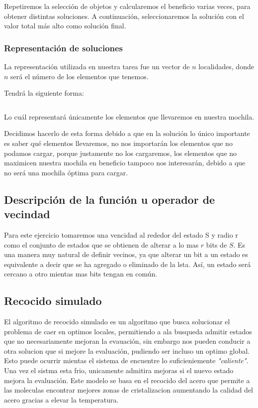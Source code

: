 \documentclass{article}
\begin{document}
Repetiremos la selección de objetos y calcularemos el beneficio varias veces, para obtener distintas soluciones. A continuación, seleccionaremos  la solución con el valor total más alto como solución final.

\subsubsection*{Representación de soluciones}
La representación utilizada en nuestra tarea fue un vector de $n$ localidades, donde $n$ será el número de los elementos que tenemos.

Tendrá la siguiente forma:

\begin{equation*}
[x_1, x_2, x_3, \dots x_n]
\end{equation*}

Lo cuál representará únicamente los elementos que llevaremos en nuestra mochila.

Decidimos hacerlo de esta forma debido a que en la solución lo único importante es saber qué elementos llevaremos, no nos importarán los elementos que no podamos cargar, porque justamente no los cargaremos, los elementos que no maximicen nuestra mochila en beneficio tampoco nos interesarán, debido a que no será una mochila óptima para cargar.

\subsection*{Descripción de la función u operador de vecindad}
Para este ejercicio tomaremos una vencidad al rededor del estado S y radio r como el conjunto de estados que se obtienen de alterar a lo mas $r$ bits de $S$. Es una manera muy natural de definir vecinos, ya que alterar un bit a un estado es equivalente a decir que se ha agregado  o eliminado de la lsta. Así, un estado será cercano a otro mientas mas bits tengan en común.

\subsection*{Recocido simulado}
	El algoritmo de recocido simulado es un algoritmo que busca solucionar el problema de caer en optimos locales, permitiendo a ala busqueda admitir estados que no necesariamente mejoran la
	evauación, sin embargo nos pueden conducir a otra solucion que si mejore la evaluación, pudiendo ser incluso un optimo global. Esto puede ocurrir mientas el sistema de encuentre lo suficieniemente 
	\textit{"caliente"}. Una vez el sistma esta frio, unicamente admitira mejoras si el nuevo estado mejora la evaluación. Este modelo se basa en el recocido del acero que permite a las moleculas encontrar mejores 
	zonas de cristalizacion aumentando la calidad del acero gracias a elevar la temperatura.
\end{document}
